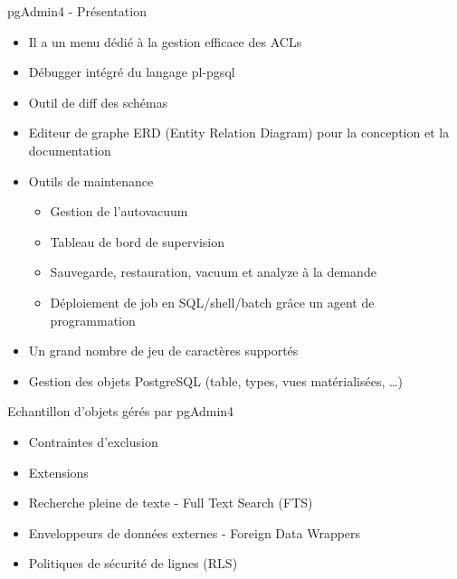 \begin{frame}{pgAdmin4 - Présentation}

   \begin{itemize}
      \item Il a un menu dédié à la gestion efficace des ACLs
      \item Débugger intégré du langage pl-pgsql
      \item Outil de diff des schémas
      \item Editeur de graphe ERD (Entity Relation Diagram) pour la conception et la documentation
      \item Outils de maintenance
      \begin{itemize}
         \item Gestion de l'autovacuum
         \item Tableau de bord de supervision
         \item Sauvegarde, restauration, vacuum et analyze à la demande
         \item Déploiement de job en SQL/shell/batch grâce un agent de programmation
      \end{itemize}
      \item Un grand nombre de jeu de caractères supportés
      \item Gestion des objets PostgreSQL (table, types, vues matérialisées, \ldots)

   \end{itemize}

\end{frame}


\begin{frame}{Echantillon d'objets gérés par pgAdmin4}

   \begin{itemize}
      \item Contraintes d'exclusion
      \item Extensions
      \item Recherche pleine de texte - Full Text Search (FTS)
      \item Enveloppeurs de données externes - Foreign Data Wrappers
      \item Politiques de sécurité de lignes (RLS)

   \end{itemize}

\end{frame}

